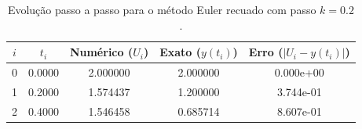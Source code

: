 \begin{table}[H]
    \centering
    \begin{tabular}{ccccc}
        \hline
        $i$ & $t_i$ & Numérico ($U_i$) & Exato ($y(t_i)$) & Erro ($|U_i - y(t_i)|$) \\
        \hline
        0 & 0.0000 & 2.000000 & 2.000000 & 0.000e+00 \\
        1 & 0.2000 & 1.574437 & 1.200000 & 3.744e-01 \\
        2 & 0.4000 & 1.546458 & 0.685714 & 8.607e-01 \\
        \hline
    \end{tabular}
    \caption{Evolução passo a passo para o método Euler recuado com passo $k=0.2$.}
    \label{tab:trajetoria_euler_recuado_k02}
\end{table}

